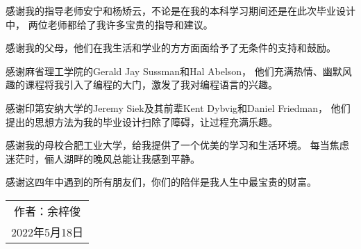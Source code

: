 
\begin{acknowledgements}

感谢我的指导老师安宁和杨矫云，不论是在我的本科学习期间还是在此次毕业设计中，
两位老师都给了我许多宝贵的指导和建议。
\begin{comment}
实验室的工作经历不仅拓宽了我的眼界，提高了我的实践能力，
也让我明白了科学技术在社会福祉中应起的责任。
\end{comment}

感谢我的父母，他们在我生活和学业的方方面面给予了无条件的支持和鼓励。

感谢麻省理工学院的Gerald Jay Sussman和Hal Abelson，
他们充满热情、幽默风趣的课程将我引入了编程的大门，激发了我对编程语言的兴趣。

感谢印第安纳大学的Jeremy Siek及其前辈Kent Dybvig和Daniel Friedman，
他们提出的思想方法为我的毕业设计扫除了障碍，让过程充满乐趣。

感谢我的母校合肥工业大学，给我提供了一个优美的学习和生活环境。
每当焦虑迷茫时，俪人湖畔的晚风总能让我感到平静。

感谢这四年中遇到的所有朋友们，你们的陪伴是我人生中最宝贵的财富。

\begin{flushright}
\begin{tabular}{ c }
作者：余梓俊 \\
2022年5月18日
\end{tabular}
\end{flushright}


\end{acknowledgements}
